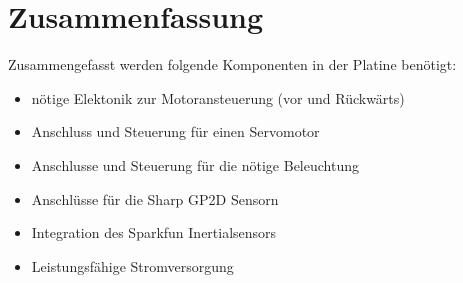 \section{Zusammenfassung}

Zusammengefasst werden folgende Komponenten in der Platine benötigt:

\begin{itemize}
 \item nötige Elektonik zur Motoransteuerung (vor und Rückwärts)
 \item Anschluss und Steuerung für einen Servomotor
 \item Anschlusse und Steuerung für die nötige Beleuchtung
 \item Anschlüsse für die Sharp GP2D Sensorn
 \item Integration des Sparkfun Inertialsensors
 \item Leistungsfähige Stromversorgung
\end{itemize}







% 

